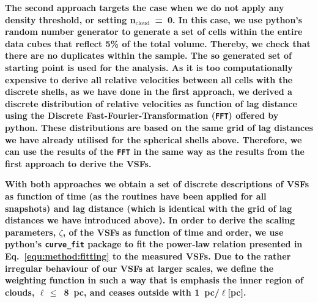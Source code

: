 \textbf{
    The second approach targets the case when we do not apply any density threshold, or setting n$_\mathrm{cloud}$~=~0.
    In this case, we use python's random number generator  to generate a set of cells within the entire data cubes that reflect 5\% of the total volume. 
    Thereby, we check that there are no duplicates within the sample.
    The so generated set of starting point is used for the analysis.
    As it is too computationally expensive to derive all relative velocities between all cells with the discrete shells, as we have done in the first approach, we derived a discrete distribution of relative velocities as function of lag distance using the Discrete Fast-Fourier-Transformation (\texttt{FFT}) offered by python.
    These distributions are based on the same grid of lag distances we have already utilised for the spherical shells above.
    Therefore, we can use the results of the \texttt{FFT} in the same way as the results from the first approach to derive the VSFs.
}

\textbf{
    With both approaches we obtain a set of discrete descriptions of VSFs as function of time (as the routines have been applied for all snapshots) and lag distance (which is identical with the grid of lag distances we have introduced above).
    In order to derive the scaling parameters, $\zeta$, of the VSFs as function of time and order, we use python's \texttt{curve\_fit} package to fit the power-law relation presented in Eq.~\ref{equ:method:fitting} to the measured VSFs.
    Due to the rather irregular behaviour of our VSFs at larger scales, we define the weighting function in such a way that is emphasis the inner region of clouds, $\ell\,\leq$~8~pc, and ceases outside with 1~pc/$\ell$[pc]. 
}

